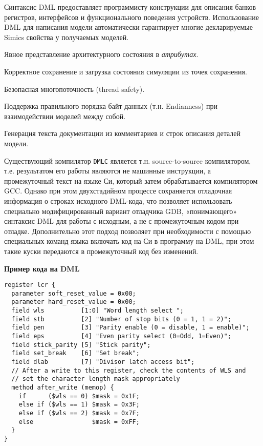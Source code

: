 Синтаксис DML предоставляет программисту конструкции для описания банков регистров, интерфейсов и функционального поведения устройств. Использование DML для написания модели автоматически гарантирует многие декларируемые Simics свойства у получаемых моделей.

\begin{itemize*}
\item Явное представление архитектурного состояния в \textit{атрибутах}.
\item Корректное сохранение и загрузка состояния симуляции из точек сохранения.
\item Безопасная многопоточность (\abbr thread safety).
\item Поддержка правильного порядка байт данных (т.н. Endianness) при взаимодействии моделей между собой.
\item Генерация текста документации из комментариев и строк описания деталей модели.
\end{itemize*}

Существующий компилятор \texttt{DMLC} является т.н. source-to-source компилятором, т.е. результатом его работы являются не машинные инструкции, а промежуточный текст на языке Си, который затем обрабатывается компилятором GCC. Однако при этом двухстадийном процессе сохраняется отладочная информация о строках исходного DML-кода, что позволяет использовать специально модифицированный вариант отладчика GDB, «понимающего» синтаксис DML для работы с исходным, а не с промежуточным кодом при отладке. Дополнительно этот подход позволяет при необходимости с помощью специальных команд языка включать код на Си в программу на DML, при этом такие куски передаются в промежуточный код без изменений.

\textbf{Пример кода на DML} %

\begin{lstlisting}
register lcr { 
  parameter soft_reset_value = 0x00; 
  parameter hard_reset_value = 0x00; 
  field wls          [1:0] "Word length select "; 
  field stb          [2] "Number of stop bits (0 = 1, 1 = 2)"; 
  field pen          [3] "Parity enable (0 = disable, 1 = enable)"; 
  field eps          [4] "Even parity select (0=Odd, 1=Even)"; 
  field stick_parity [5] "Stick parity"; 
  field set_break    [6] "Set break"; 
  field dlab         [7] "Divisor latch access bit"; 
  // After a write to this register, check the contents of WLS and  
  // set the character length mask appropriately 
  method after_write (memop) { 
    if      ($wls == 0) $mask = 0x1F; 
    else if ($wls == 1) $mask = 0x3F; 
    else if ($wls == 2) $mask = 0x7F; 
    else                $mask = 0xFF; 
  } 
}   
\end{lstlisting} 


